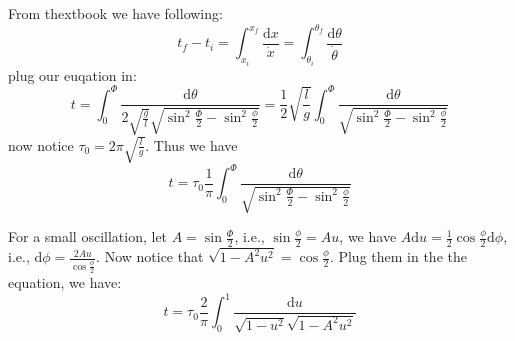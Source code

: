 \documentclass{article}
\newcommand{\de}{\mathrm{d}}
\begin{document}
From thextbook we have following:
\[
t_f - t_i = \int_{x_i}^{x_f}\frac{\de x}{\dot{x}} = \int_{\theta_i}^{\theta_f}\frac{\de \theta}{\dot{\theta}}
\]
plug our euqation in:
\[
t = \int_0^\Phi \frac{\de \theta}{2\sqrt{\frac{g}{l}}\sqrt{\sin^2\frac{\Phi}{2} - \sin^2\frac{\phi}{2}}} = \frac{1}{2}\sqrt{\frac{l}{g}}\int_0^\Phi\frac{\de \theta}{\sqrt{\sin^2\frac{\Phi}{2} - \sin^2\frac{\phi}{2}}}
\]
now notice $\tau_0 = 2\pi \sqrt{\frac{l}{g}}$. Thus we have 
\[
t = \tau_0 \frac{1}{\pi}\int_0^\Phi\frac{\de \theta}{\sqrt{\sin^2\frac{\Phi}{2} - \sin^2\frac{\phi}{2}}}
\]

For a small oscillation, let $A = \sin\frac{\Phi}{2}$, i.e., $\sin\frac{\phi}{2} = Au$, we have $A\de u = \frac{1}{2}\cos\frac{\phi}{2}\de \phi$, i.e., $\de \phi = \frac{2Au}{\cos\frac{\phi}{2}}$. Now notice that $\sqrt{1-A^2u^2} = \cos\frac{\phi}{2}$. Plug them in the the equation, we have:
\[
t = \tau_0 \frac{2}{\pi}\int_0^1\frac{\de u}{\sqrt{1-u^2}\sqrt{1-A^2u^2}}
\]
\end{document}
